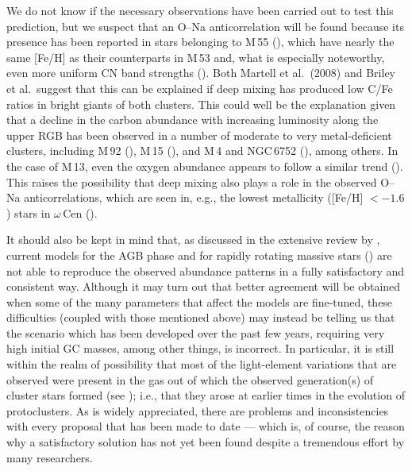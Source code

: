 \documentclass[12pt,preprint]{aastex}
\begin{document}
We do not know if the necessary observations have been carried out to test this
prediction, but we suspect that an O--Na anticorrelation will be found because
its presence has been reported in stars belonging to M$\,$55
(\citealt{cbg09c}), which have nearly the same [Fe/H] as their counterparts in
M$\,$53 and, what is especially noteworthy, even more uniform CN band strengths
(\citealt{bsh93}).   Both Martell et al.~(2008) and Briley et al.~suggest that
this can be explained if deep mixing has produced low C/Fe ratios in bright
giants of both clusters.  This could well be the explanation given that a
decline in the carbon abundance with increasing luminosity along the upper RGB
has been observed in a number of moderate to very metal-deficient clusters,
including M$\,$92 (\citealt{clb82}), M$\,$15 (\citealt{tcl83}), and M$\,$4 and
NGC$\,$6752 (\citealt{ss91}), among others.  In the case of M$\,$13, even the
oxygen abundance appears to follow a similar trend (\citealt{jp12}).  This
raises the possibility that deep mixing also plays a role in the observed O--Na
anticorrelations, which are seen in, e.g., the lowest metallicity ([Fe/H] $<
-1.6$) stars in $\omega\,$Cen (\citealt[see their Fig.~19]{jp10}).

It should also be kept in mind that, as discussed in the extensive review by
\citet[also see \citealt{ren08}]{gcb12}, current models for the AGB phase and
for rapidly rotating massive stars (\citealt[and references therein]{dmc07})
are not able to reproduce the observed abundance patterns in a fully
satisfactory and consistent way.  Although it may turn out that better agreement
will be obtained when some of the many parameters that affect the
models are fine-tuned, these difficulties (coupled with those mentioned above)
may instead be telling us that the scenario which has been developed over the
past few years, requiring very high initial GC masses, among other things, is
incorrect.  In particular, it is still within the realm of possibility that
most of the light-element variations that are observed were present in the gas
out of which the observed generation(s) of cluster stars formed (see
\citealt{dh13}); i.e., that they arose at earlier times in the evolution of
protoclusters.  As is widely appreciated, there are problems and inconsistencies
with every proposal that has been made to date --- which is, of course, the
reason why a satisfactory solution has not yet been found despite a tremendous
effort by many researchers.


\end{document}
